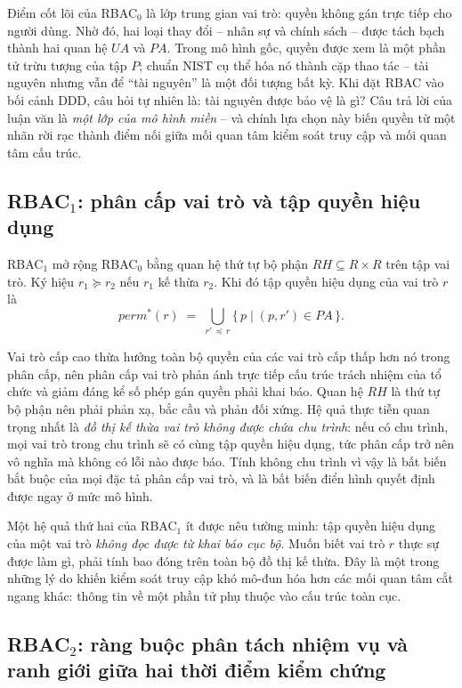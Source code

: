 Điểm cốt lõi của RBAC$_0$ là lớp trung gian vai trò: quyền không gán trực tiếp cho người dùng. Nhờ đó, hai loại thay đổi -- nhân sự và chính sách -- được tách bạch thành hai quan hệ $UA$ và $PA$. Trong mô hình gốc, quyền được xem là một phần tử trừu tượng của tập $P$; chuẩn NIST cụ thể hóa nó thành cặp thao tác -- tài nguyên nhưng vẫn để ``tài nguyên'' là một đối tượng bất kỳ. Khi đặt RBAC vào bối cảnh DDD, câu hỏi tự nhiên là: tài nguyên được bảo vệ là gì? Câu trả lời của luận văn là \emph{một lớp của mô hình miền} -- và chính lựa chọn này biến quyền từ một nhãn rời rạc thành điểm nối giữa mối quan tâm kiểm soát truy cập và mối quan tâm cấu trúc.

\subsection{RBAC$_1$: phân cấp vai trò và tập quyền hiệu dụng}

\begin{dinhnghia}[RBAC$_1$]
\label{dn:rbac1}
RBAC$_1$ mở rộng RBAC$_0$ bằng quan hệ thứ tự bộ phận $RH \subseteq R \times R$ trên tập vai trò. Ký hiệu $r_1 \succeq r_2$ nếu $r_1$ kế thừa $r_2$. Khi đó tập quyền hiệu dụng của vai trò $r$ là
\[
  \mathit{perm}^{*}(r) \;=\; \bigcup_{r' \,\preceq\, r} \{\, p \mid (p, r') \in PA \,\}.
\]
\end{dinhnghia}

Vai trò cấp cao thừa hưởng toàn bộ quyền của các vai trò cấp thấp hơn nó trong phân cấp, nên phân cấp vai trò phản ánh trực tiếp cấu trúc trách nhiệm của tổ chức và giảm đáng kể số phép gán quyền phải khai báo. Quan hệ $RH$ là thứ tự bộ phận nên phải phản xạ, bắc cầu và phản đối xứng. Hệ quả thực tiễn quan trọng nhất là \emph{đồ thị kế thừa vai trò không được chứa chu trình}: nếu có chu trình, mọi vai trò trong chu trình sẽ có cùng tập quyền hiệu dụng, tức phân cấp trở nên vô nghĩa mà không có lỗi nào được báo. Tính không chu trình vì vậy là bất biến bắt buộc của mọi đặc tả phân cấp vai trò, và là bất biến điển hình quyết định được ngay ở mức mô hình.

Một hệ quả thứ hai của RBAC$_1$ ít được nêu tường minh: tập quyền hiệu dụng của một vai trò \emph{không đọc được từ khai báo cục bộ}. Muốn biết vai trò $r$ thực sự được làm gì, phải tính bao đóng trên toàn bộ đồ thị kế thừa. Đây là một trong những lý do khiến kiểm soát truy cập khó mô-đun hóa hơn các mối quan tâm cắt ngang khác: thông tin về một phần tử phụ thuộc vào cấu trúc toàn cục.

\subsection{RBAC$_2$: ràng buộc phân tách nhiệm vụ và ranh giới giữa hai thời điểm kiểm chứng}

